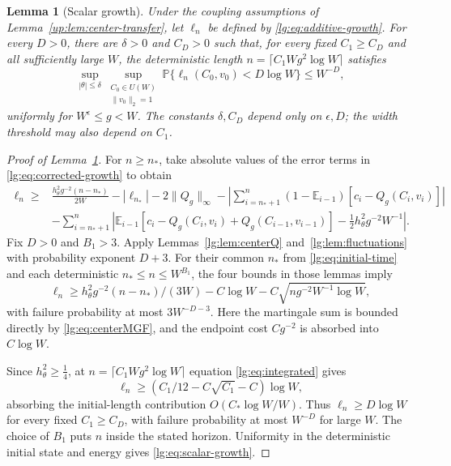 \documentclass[11pt]{article}
\numberwithin{equation}{section}
\newtheorem{lemma}[theorem]{Lemma}
\theoremstyle{remark}
\newcommand{\E}{\mathbb E}
\newcommand{\Prob}{\mathbb P}
\begin{document}
\begin{lemma}[Scalar growth]\label{lg:lem:scalar-growth}
Under the coupling assumptions of Lemma~\ref{up:lem:center-transfer}, let $\ell_n$
be defined by \eqref{lg:eq:additive-growth}. For every $D>0$, there are
$\delta>0$ and $C_D>0$ such that, for every fixed $C_1\ge C_D$ and all
sufficiently large $W$, the deterministic length
$n=\lceil C_1Wg^2\log W\rceil$ satisfies
\begin{equation}\label{lg:eq:scalar-growth}
 \sup_{|\theta|\le\delta}
 \sup_{\substack{C_0\in U(W)\\\|v_0\|_2=1}}
 \Prob\{\ell_{n}(C_0,v_0)<D\log W\}\le W^{-D},
\end{equation}
uniformly for $W^\epsilon\le g<W$. The constants $\delta,C_D$
depend only on $\epsilon,D$; the width threshold may also depend
on $C_1$.  
\end{lemma}

\begin{proof}[Proof of Lemma~\ref{lg:lem:scalar-growth}]
For $n\ge n_*$, take absolute values of the error terms in
\eqref{lg:eq:corrected-growth} to obtain
\begin{equation}\label{lg:eq:growth-lower-bound}
 \begin{aligned}
 \ell_n\ge{}&\frac{h_\theta^2g^{-2}(n-n_*)}{2W}
       -|\ell_{n_*}|-2\|Q_g\|_\infty
       -\left|\sum_{i=n_*+1}^n(1-\E_{i-1})[c_i-Q_g(C_i,v_i)]\right|\\
 &-\sum_{i=n_*+1}^n\left|\E_{i-1}
       [c_i-Q_g(C_i,v_i)+Q_g(C_{i-1},v_{i-1})]
       -\tfrac12h_\theta^2g^{-2}W^{-1}\right|.
 \end{aligned}
\end{equation}
Fix $D>0$ and $B_1>3$. Apply
Lemmas~\ref{lg:lem:centerQ} and~\ref{lg:lem:fluctuations}
with probability exponent $D+3$.
For their common $n_*$ from \eqref{lg:eq:initial-time} and each deterministic
$n_*\le n\le W^{B_1}$, the four bounds in those lemmas imply
\begin{equation}\label{lg:eq:integrated}
 \ell_n\ge h_\theta^2g^{-2}(n-n_*)/(3W)-C\log W
                        -C\sqrt{ng^{-2}W^{-1}\log W},
\end{equation}
with failure probability at most $3W^{-D-3}$.
Here the martingale sum is bounded directly by
\eqref{lg:eq:centerMGF}, and the endpoint cost $Cg^{-2}$ is absorbed
into $C\log W$.

Since $h_\theta^2\ge\tfrac14$, at $n=\lceil C_1Wg^2\log W\rceil$
equation \eqref{lg:eq:integrated} gives
\[
 \ell_n\ge(C_1/12-C\sqrt{C_1}-C)\log W,
\]
absorbing the initial-length contribution $O(C_*\log W/W)$.
Thus $\ell_{n}\ge D\log W$ for every fixed $C_1\ge C_D$,
with failure probability at most $W^{-D}$ for large $W$.
The choice of $B_1$ puts $n$ inside the stated horizon.
Uniformity in the deterministic initial state and energy gives
\eqref{lg:eq:scalar-growth}.
\end{proof}
\end{document}
